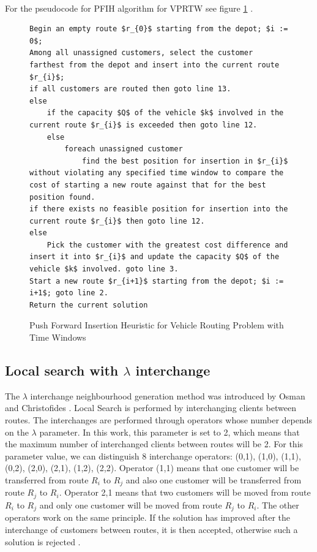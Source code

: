 \documentclass[a4paper,twoside,12pt]{book}
\begin{document}
\paragraph{}
For the pseudocode for PFIH algorithm for VPRTW see figure \ref{fig:PFIH} \cite{bib:chapter:PFIH}.
\begin{figure}
\centering
\begin{lstlisting}[mathescape=true]
Begin an empty route $r_{0}$ starting from the depot; $i := 0$;
Among all unassigned customers, select the customer farthest from the depot and insert into the current route $r_{i}$;
if all customers are routed then goto line 13.
else
    if the capacity $Q$ of the vehicle $k$ involved in the current route $r_{i}$ is exceeded then goto line 12.
	else
    	foreach unassigned customer
    		find the best position for insertion in $r_{i}$ without violating any specified time window to compare the cost of starting a new route against that for the best position found.   
if there exists no feasible position for insertion into the current route $r_{i}$ then goto line 12.
else
	Pick the customer with the greatest cost difference and insert it into $r_{i}$ and update the capacity $Q$ of the vehicle $k$ involved. goto line 3.
Start a new route $r_{i+1}$ starting from the depot; $i := i+1$; goto line 2.
Return the current solution
\end{lstlisting}
\caption{Push Forward Insertion Heuristic for Vehicle Routing Problem with Time Windows}
\label{fig:PFIH}
\end{figure}
\subsection{Local search with $\lambda$ interchange}
The $\lambda$ interchange neighbourhood generation method was introduced by Osman and Christofides \cite{bib:article:osman}. Local Search is performed by interchanging clients between routes. The interchanges are performed through operators whose number depends on the $\lambda$ parameter. In this work, this parameter is set to 2, which means that the maximum number of interchanged clients between routes will be 2. For this parameter value, we can distinguish 8 interchange operators: (0,1), (1,0), (1,1), (0,2), (2,0), (2,1), (1,2), (2,2). Operator (1,1) means that one customer will be transferred from route $R_{i}$ to $R_{j}$ and also one customer will be transferred from route $R_{j}$ to $R_{i}$. Operator 2,1 means that two customers will be moved from route $R_{i}$ to $R_{j}$ and only one customer will be moved from route $R_{j}$ to $R_{i}$. The other operators work on the same principle. If the solution has improved after the interchange of customers between routes, it is then accepted, otherwise such a solution is rejected \cite{bib:article:LocalSearchLambda}. 
\end{document}

